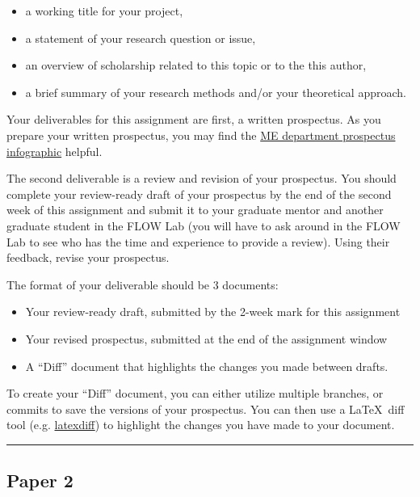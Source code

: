 \documentclass[12pt]{article}
\begin{document}
\begin{itemize}
	\item a working title for your project,
	\item a statement of your research question or issue,
	\item an overview of scholarship related to this topic or to the this author,
	\item a brief summary of your research methods and/or your theoretical approach.
\end{itemize}

Your deliverables for this assignment are first, a written prospectus.
As you prepare your written prospectus, you may find the \href{https://www.me.byu.edu/00000177-4afb-d009-abf7-ebff31d50000/prospectus-outline-pdf-pdf}{ME department prospectus infographic} helpful.

The second deliverable is a review and revision of your prospectus.  You should complete your review-ready draft of your prospectus by the end of the second week of this assignment and submit it to your graduate mentor and another graduate student in the FLOW Lab (you will have to ask around in the FLOW Lab to see who has the time and experience to provide a review).  Using their feedback, revise your prospectus.

The format of your deliverable should be 3 documents:
\begin{itemize}
	\item Your review-ready draft, submitted by the 2-week mark for this assignment
	\item Your revised prospectus, submitted at the end of the assignment window
	\item A ``Diff'' document that highlights the changes you made between drafts.
\end{itemize}

To create your ``Diff'' document, you can either utilize multiple branches, or commits to save the versions of your prospectus.  You can then use a \LaTeX~diff tool (e.g. \href{https://texblog.org/2018/08/14/track-changes-with-latexdiff/}{latexdiff}) to highlight the changes you have made to your document.

\vspace{1em}\hrule\vspace{1em}
\subsection{Paper 2}
\label{ssec:p2}
\end{document}
